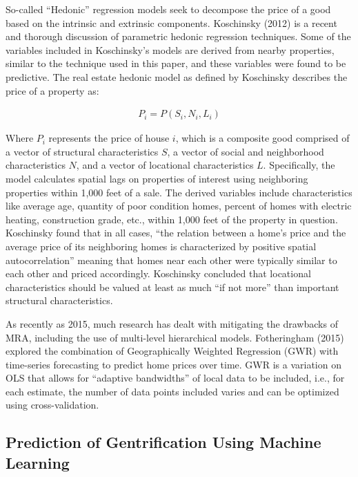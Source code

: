 \documentclass[12pt,]{article}
\begin{document}
So-called ``Hedonic'' regression models seek to decompose the price of a
good based on the intrinsic and extrinsic components. Koschinsky (2012)
is a recent and thorough discussion of parametric hedonic regression
techniques. Some of the variables included in Koschinsky's models are
derived from nearby properties, similar to the technique used in this
paper, and these variables were found to be predictive. The real estate
hedonic model as defined by Koschinsky describes the price of a property
as:

\[
\begin{aligned}
 P_i = P(S_i, N_i, L_i)
\end{aligned}
\]

Where \(P_i\) represents the price of house \(i\), which is a composite
good comprised of a vector of structural characteristics \(S\), a vector
of social and neighborhood characteristics \(N\), and a vector of
locational characteristics \(L\). Specifically, the model calculates
spatial lags on properties of interest using neighboring properties
within 1,000 feet of a sale. The derived variables include
characteristics like average age, quantity of poor condition homes,
percent of homes with electric heating, construction grade, etc., within
1,000 feet of the property in question. Koschinsky found that in all
cases, ``the relation between a home's price and the average price of
its neighboring homes is characterized by positive spatial
autocorrelation'' meaning that homes near each other were typically
similar to each other and priced accordingly. Koschinsky concluded that
locational characteristics should be valued at least as much ``if not
more'' than important structural characteristics.

As recently as 2015, much research has dealt with mitigating the
drawbacks of MRA, including the use of multi-level hierarchical models.
Fotheringham (2015) explored the combination of Geographically Weighted
Regression (GWR) with time-series forecasting to predict home prices
over time. GWR is a variation on OLS that allows for ``adaptive
bandwidths'' of local data to be included, i.e., for each estimate, the
number of data points included varies and can be optimized using
cross-validation.

\hypertarget{prediction-of-gentrification-using-machine-learning}{%
\subsection{Prediction of Gentrification Using Machine
Learning}\label{prediction-of-gentrification-using-machine-learning}}
\end{document}
